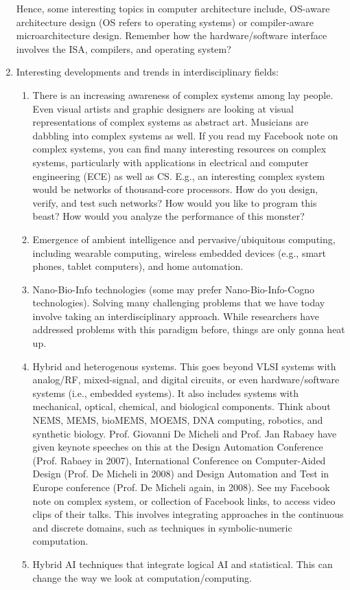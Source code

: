 \begin{enumerate}
Hence, some interesting topics in computer architecture include, OS-aware architecture design (OS refers to operating systems) or compiler-aware microarchitecture design. Remember how the hardware/software interface involves the ISA, compilers, and operating system?
\item Interesting developments and trends in interdisciplinary fields: \vspace{-0.3cm}
	\begin{enumerate} \itemsep -2pt
	\item There is an increasing awareness of complex systems among lay people. Even visual artists and graphic designers are looking at visual representations of complex systems as abstract art. Musicians are dabbling into complex systems as well. If you read my Facebook note on complex systems, you can find many interesting resources on complex systems, particularly with applications in electrical and computer engineering (ECE) as well as CS. E.g., an interesting complex system would be networks of thousand-core processors. How do you design, verify, and test such networks? How would you like to program this beast? How would you analyze the performance of this monster?
	\item Emergence of ambient intelligence and pervasive/ubiquitous computing, including wearable computing, wireless embedded devices (e.g., smart phones, tablet computers), and home automation.
	\item Nano-Bio-Info technologies (some may prefer Nano-Bio-Info-Cogno technologies). Solving many challenging problems that we have today involve taking an interdisciplinary approach. While researchers have addressed problems with this paradigm before, things are only gonna heat up.
	\item Hybrid and heterogenous systems. This goes beyond VLSI systems with analog/RF, mixed-signal, and digital circuits, or even hardware/software systems (i.e., embedded systems). It also includes systems with mechanical, optical, chemical, and biological components. Think about NEMS, MEMS, bioMEMS, MOEMS, DNA computing, robotics, and synthetic biology. Prof. Giovanni De Micheli and Prof. Jan Rabaey have given keynote speeches on this at the Design Automation Conference (Prof. Rabaey in 2007), International Conference on Computer-Aided Design (Prof. De Micheli in 2008) and Design Automation and Test in Europe conference (Prof. De Micheli again, in 2008). See my Facebook note on complex system, or collection of Facebook links, to access video clips of their talks. This involves integrating approaches in the continuous and discrete domains, such as techniques in symbolic-numeric computation.
	\item Hybrid AI techniques that integrate logical AI and statistical. This can change the way we look at computation/computing.
	\end{enumerate}
\end{enumerate}


